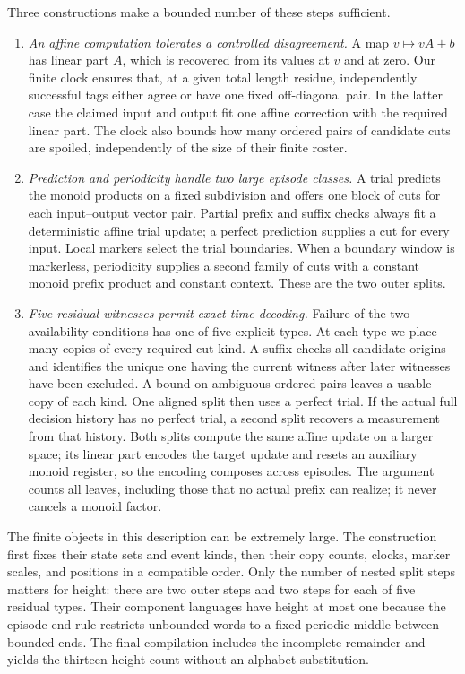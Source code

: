 Three constructions make a bounded number of these steps sufficient.
\begin{enumerate}[leftmargin=*,label=\textup{\arabic*.}]
\item \emph{An affine computation tolerates a controlled disagreement.}
A map \(v\mapsto vA+b\) has linear part \(A\), which is recovered
from its values at \(v\) and at zero. Our finite clock ensures that,
at a given total length residue, independently successful tags either
agree or have one fixed off-diagonal pair. In the latter case the
claimed input and output fit one affine correction with the required
linear part. The clock also bounds how many ordered pairs of candidate
cuts are spoiled, independently of the size of their finite roster.
\item \emph{Prediction and periodicity handle two large episode classes.}
A trial predicts the monoid products on a fixed subdivision and offers
one block of cuts for each input--output vector pair. Partial prefix
and suffix checks always fit a deterministic affine trial update;
a perfect prediction supplies a cut for every input. Local markers
select the trial boundaries. When a boundary window is markerless,
periodicity supplies a second family of cuts with a constant monoid
prefix product and constant context. These are the two outer splits.
\item \emph{Five residual witnesses permit exact time decoding.}
Failure of the two availability conditions has one of five explicit
types. At each type we place many copies of every required cut kind.
A suffix checks all candidate origins and identifies the unique one
having the current witness after later witnesses have been excluded.
A bound on ambiguous ordered pairs leaves a usable copy of each kind.
One aligned split then uses a perfect trial. If the actual full decision
history has no perfect trial, a second split recovers a measurement
from that history. Both splits compute the same affine update on a
larger space; its linear part encodes the target update and resets an
auxiliary monoid register, so the encoding composes across episodes.
The argument counts all leaves, including those that no actual prefix
can realize; it never cancels a monoid factor.
\end{enumerate}

The finite objects in this description can be extremely large. The
construction first fixes their state sets and event kinds, then their
copy counts, clocks, marker scales, and positions in a compatible order.
Only the number of nested split steps matters for height: there are two
outer steps and two steps for each of five residual types. Their component
languages have height at most one because the episode-end rule restricts
unbounded words to a fixed periodic middle between bounded ends. The
final compilation includes the incomplete remainder and yields the
thirteen-height count without an alphabet substitution.


